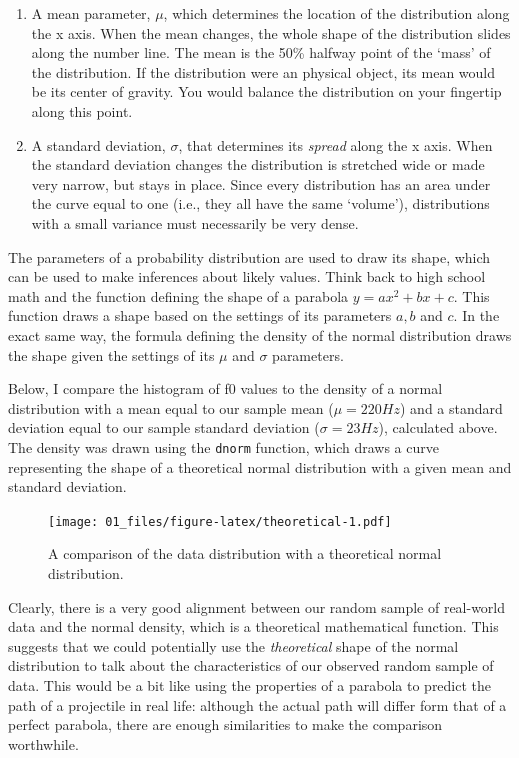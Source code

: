 \documentclass[
]{book}
\begin{document}
\begin{enumerate}
\def\labelenumi{\arabic{enumi}.}
\item
  A mean parameter, \(\mu\), which determines the location of the distribution along the x axis. When the mean changes, the whole shape of the distribution slides along the number line. The mean is the 50\% halfway point of the `mass' of the distribution. If the distribution were an physical object, its mean would be its center of gravity. You would balance the distribution on your fingertip along this point.
\item
  A standard deviation, \(\sigma\), that determines its \emph{spread} along the x axis. When the standard deviation changes the distribution is stretched wide or made very narrow, but stays in place. Since every distribution has an area under the curve equal to one (i.e., they all have the same `volume'), distributions with a small variance must necessarily be very dense.
\end{enumerate}

The parameters of a probability distribution are used to draw its shape, which can be used to make inferences about likely values. Think back to high school math and the function defining the shape of a parabola \(y = ax^2+bx+c\). This function draws a shape based on the settings of its parameters \(a, b\) and \(c\). In the exact same way, the formula defining the density of the normal distribution draws the shape given the settings of its \(\mu\) and \(\sigma\) parameters.

Below, I compare the histogram of f0 values to the density of a normal distribution with a mean equal to our sample mean (\(\mu = 220 Hz\)) and a standard deviation equal to our sample standard deviation (\(\sigma = 23 Hz\)), calculated above. The density was drawn using the \texttt{dnorm} function, which draws a curve representing the shape of a theoretical normal distribution with a given mean and standard deviation.

\begin{figure}
\centering
\texttt{[image: 01\_files/figure-latex/theoretical-1.pdf]}
\caption{\label{fig:theoretical}A comparison of the data distribution with a theoretical normal distribution.}
\end{figure}

Clearly, there is a very good alignment between our random sample of real-world data and the normal density, which is a theoretical mathematical function. This suggests that we could potentially use the \emph{theoretical} shape of the normal distribution to talk about the characteristics of our observed random sample of data. This would be a bit like using the properties of a parabola to predict the path of a projectile in real life: although the actual path will differ form that of a perfect parabola, there are enough similarities to make the comparison worthwhile.
\end{document}
